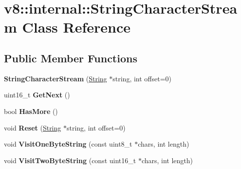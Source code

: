 \hypertarget{classv8_1_1internal_1_1_string_character_stream}{}\section{v8\+:\+:internal\+:\+:String\+Character\+Stream Class Reference}
\label{classv8_1_1internal_1_1_string_character_stream}
\subsection*{Public Member Functions}
\begin{DoxyCompactItemize}
\item 
{\bfseries String\+Character\+Stream} (\hyperlink{classv8_1_1internal_1_1_string}{String} $\ast$string, int offset=0)\hypertarget{classv8_1_1internal_1_1_string_character_stream_a30ec5ee085ddaaae1c635dcf709f220e}{}\label{classv8_1_1internal_1_1_string_character_stream_a30ec5ee085ddaaae1c635dcf709f220e}

\item 
uint16\+\_\+t {\bfseries Get\+Next} ()\hypertarget{classv8_1_1internal_1_1_string_character_stream_a78769916c2be83815a1a5b1a849d73fe}{}\label{classv8_1_1internal_1_1_string_character_stream_a78769916c2be83815a1a5b1a849d73fe}

\item 
bool {\bfseries Has\+More} ()\hypertarget{classv8_1_1internal_1_1_string_character_stream_a5f6356cddd0737cffccb427d703009b0}{}\label{classv8_1_1internal_1_1_string_character_stream_a5f6356cddd0737cffccb427d703009b0}

\item 
void {\bfseries Reset} (\hyperlink{classv8_1_1internal_1_1_string}{String} $\ast$string, int offset=0)\hypertarget{classv8_1_1internal_1_1_string_character_stream_a3b95592d9d9c070e6659367f0b4b9416}{}\label{classv8_1_1internal_1_1_string_character_stream_a3b95592d9d9c070e6659367f0b4b9416}

\item 
void {\bfseries Visit\+One\+Byte\+String} (const uint8\+\_\+t $\ast$chars, int length)\hypertarget{classv8_1_1internal_1_1_string_character_stream_abe0d02d44289edc138b56869b7d04ae3}{}\label{classv8_1_1internal_1_1_string_character_stream_abe0d02d44289edc138b56869b7d04ae3}

\item 
void {\bfseries Visit\+Two\+Byte\+String} (const uint16\+\_\+t $\ast$chars, int length)\hypertarget{classv8_1_1internal_1_1_string_character_stream_acff2c676fd4a935932defc454e3518f5}{}\label{classv8_1_1internal_1_1_string_character_stream_acff2c676fd4a935932defc454e3518f5}

\end{DoxyCompactItemize}
